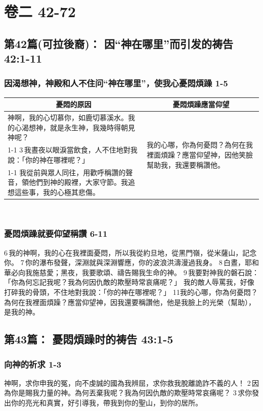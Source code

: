\section{卷二 42-72}

\subsection{第42篇(可拉後裔)： 因“神在哪里”而引发的祷告 42:1-11}
\subsubsection{因渴想神，神殿和人不住问“神在哪里”，使我心憂悶煩躁 1-5}
\begin{table}[H]
\centering
\begin{tabular}{p{13.5cm}|p{3.700cm}}\hline\hline
\multicolumn{1}{c|}{憂悶的原因}&\multicolumn{1}{c}{憂悶煩躁應當仰望}\\\hline
神啊，我的心切慕你，如鹿切慕溪水。我的心渴想神，就是永生神，我幾時得朝見神呢？
&\multirow{3}{3.9cm}{我的心哪，你為何憂悶？為何在我裡面煩躁？應當仰望神，因他笑臉幫助我，我還要稱讚他。}\\\cline{1-1}
3 我晝夜以眼淚當飲食，人不住地對我說：「你的神在哪裡呢？」&\\\cline{1-1}
我從前與眾人同往，用歡呼稱讚的聲音，領他們到神的殿裡，大家守節。我追想這些事，我的心極其悲傷。&\\\hline
\end{tabular}
\end{table} 

\subsubsection{憂悶煩躁就要仰望稱讚 6-11}
6 我的神啊，我的心在我裡面憂悶，所以我從約旦地，從黑門嶺，從米薩山，記念你。
7 你的瀑布發聲，深淵就與深淵響應，你的波浪洪濤漫過我身。
8 白晝，耶和華必向我施慈愛；黑夜，我要歌頌、禱告賜我生命的神。
9 我要對神我的磐石說：「你為何忘記我呢？我為何因仇敵的欺壓時常哀痛呢？」
我的敵人辱罵我，好像打碎我的骨頭，不住地對我說：「你的神在哪裡呢？」
11我的心哪，你為何憂悶？為何在我裡面煩躁？應當仰望神，因我還要稱讚他，他是我臉上的光榮（幫助），是我的神。

\subsection{第43篇： 憂悶煩躁时的祷告 43:1-5}
\subsubsection{向神的祈求 1-3}
神啊，求你申我的冤，向不虔誠的國為我辨屈，求你救我脫離詭詐不義的人！
2 因為你是賜我力量的神。為何丟棄我呢？我為何因仇敵的欺壓時常哀痛呢？
3 求你發出你的亮光和真實，好引導我，帶我到你的聖山，到你的居所。

